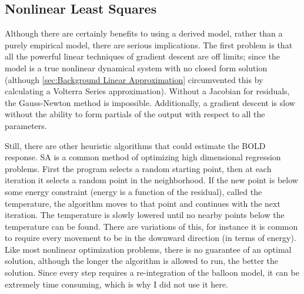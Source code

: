 \subsection{Nonlinear Least Squares}
\label{sec:Nonlinear Least Squares}
Although there are certainly benefits to using a derived model, rather
than a purely empirical model, there are serious implications. The
first problem is that all the powerful linear techniques of gradient
descent are off limits; since the model is a true nonlinear dynamical
system with no closed form solution (although \autoref{sec:Background Linear Approximation}
circumvented this by calculating a Volterra Series approximation). Without
a Jacobian for residuals, the Gauss-Newton method
is impossible. Additionally, a gradient descent is slow
without the ability to form partials of the output with respect
to all the parameters. 

Still, there are other heuristic algorithms
that could estimate the \ac{BOLD} response. 
\ac{SA} is a common method of optimizing high dimensional
regression problems. First the program selects a random starting point, then
at each iteration it selects a random point in the neighborhood. If the 
new point is 
below some energy constraint (energy is a function of the residual), 
called the temperature, the algorithm moves
to that point and continues with the next iteration. The temperature
is slowly lowered until no nearby points below the temperature can
be found. There are
variations of this, for instance it is common to require every movement
to be in the downward direction (in terms of energy). Like most nonlinear
optimization problems, there is no guarantee of an optimal solution,
although the longer the algorithm is allowed to run, the better the solution.
Since every step requires a re-integration of the  
balloon model, it can be extremely time consuming, which is why I did 
not use it here.


